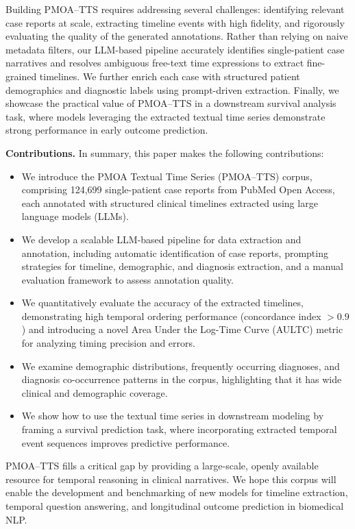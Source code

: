 Building PMOA–TTS requires addressing several challenges: identifying relevant case reports at scale, extracting timeline events with high fidelity, and rigorously evaluating the quality of the generated annotations.
Rather than relying on naive metadata filters, our LLM-based pipeline accurately identifies single-patient case narratives and resolves ambiguous free-text time expressions to extract fine-grained timelines.
We further enrich each case with structured patient demographics and diagnostic labels using prompt-driven extraction.
Finally, we showcase the practical value of PMOA–TTS in a downstream survival analysis task, where models leveraging the extracted textual time series demonstrate strong performance in early outcome prediction.


\textbf{Contributions.} In summary, this paper makes the following contributions:
\begin{itemize}[leftmargin=*,itemsep=0pt,parsep=0pt,partopsep=0pt,topsep=0pt]
    \item We introduce the PMOA Textual Time Series (PMOA–TTS) corpus, comprising 124,699 single-patient case reports from PubMed Open Access, each annotated with structured clinical timelines extracted using large language models (LLMs).
    \item We develop a scalable LLM-based pipeline for data extraction and annotation, including automatic identification of case reports, prompting strategies for timeline, demographic, and diagnosis extraction, and a manual evaluation framework to assess annotation quality.
    \item We quantitatively evaluate the accuracy of the extracted timelines, demonstrating high temporal ordering performance (concordance index $>0.9$) and introducing a novel Area Under the Log-Time Curve (AULTC) metric for analyzing timing precision and errors.
    \item We examine demographic distributions, frequently occurring diagnoses, and diagnosis co-occurrence patterns in the corpus, highlighting that it has wide clinical and demographic coverage.
    \item We show how to use the textual time series in downstream modeling by framing a survival prediction task, where incorporating extracted temporal event sequences improves predictive performance.
\end{itemize}

PMOA–TTS fills a critical gap by providing a large-scale, openly available resource for temporal reasoning in clinical narratives.
We hope this corpus will enable the development and benchmarking of new models for timeline extraction, temporal question answering, and longitudinal outcome prediction in biomedical NLP.

